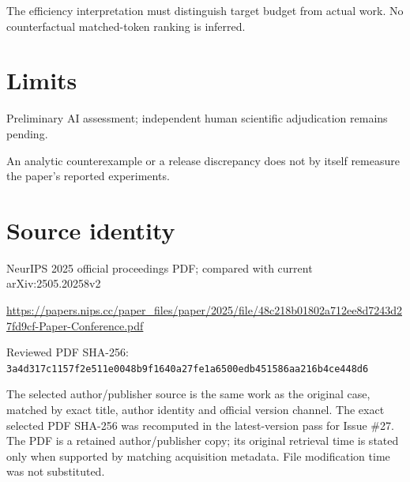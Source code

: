 \documentclass[11pt]{article}
\begin{document}
The efficiency interpretation must distinguish target budget from actual work. No counterfactual matched-token ranking is inferred.

\section*{Limits}

Preliminary AI assessment; independent human scientific adjudication remains pending.\par

An analytic counterexample or a release discrepancy does not by itself remeasure the paper’s reported experiments.\par

\section*{Source identity}

NeurIPS 2025 official proceedings PDF; compared with current arXiv:2505.20258v2

\url{https://papers.nips.cc/paper_files/paper/2025/file/48c218b01802a712ee8d7243d27fd9cf-Paper-Conference.pdf}

Reviewed PDF SHA-256: \nolinkurl{3a4d317c1157f2e511e0048b9f1640a27fe1a6500edb451586aa216b4ce448d6}

The selected author/publisher source is the same work as the original case, matched by exact title, author identity and official version channel. The exact selected PDF SHA-256 was recomputed in the latest-version pass for Issue \#27. The PDF is a retained author/publisher copy; its original retrieval time is stated only when supported by matching acquisition metadata. File modification time was not substituted.
\end{document}
